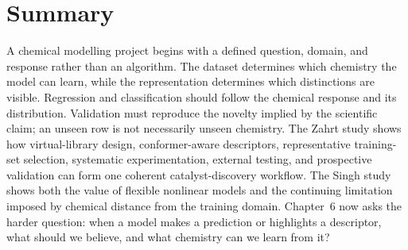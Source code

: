 
\section{Summary}

A chemical modelling project begins with a defined question, domain, and response rather than an algorithm.
The dataset determines which chemistry the model can learn, while the representation determines which distinctions are visible.
Regression and classification should follow the chemical response and its distribution.
Validation must reproduce the novelty implied by the scientific claim; an unseen row is not necessarily unseen chemistry.
The Zahrt study shows how virtual-library design, conformer-aware descriptors, representative training-set selection, systematic experimentation, external testing, and prospective validation can form one coherent catalyst-discovery workflow.
The Singh study shows both the value of flexible nonlinear models and the continuing limitation imposed by chemical distance from the training domain.
Chapter~6 now asks the harder question: when a model makes a prediction or highlights a descriptor, what should we believe, and what chemistry can we learn from it?
